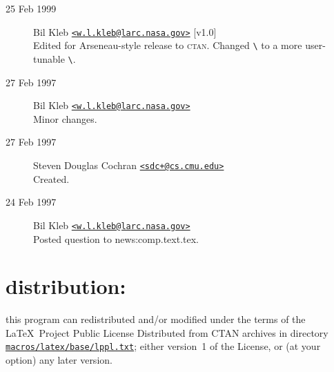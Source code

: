 \documentclass[pagesize=auto, fontsize=12pt, DIV=10, headings=normal]{scrartcl}
\makeatletter
\newcommand*{\bmail}[1]{\href{mailto:#1}{\texttt{<#1>}}}
\newcommand*{\cs}[1]{\texttt{\textbackslash#1}}
\newcommand*{\cmd}[1]{\cs{\expandafter\@gobble\string#1}}
\makeatother
\begin{document}
\begin{description}
\item[25 Feb 1999]
  Bil Kleb \bmail{w.l.kleb@larc.nasa.gov} [v1.0]\\
  Edited for Arseneau-style release to \textsc{ctan}.
  Changed \cmd{\sfm@colsep} to a more user-tunable \cmd{\sfmcolsep}.

\item[27 Feb 1997]
  Bil Kleb \bmail{w.l.kleb@larc.nasa.gov}\\
  Minor changes.

\item[27 Feb 1997]
  Steven Douglas Cochran \bmail{sdc+@cs.cmu.edu}\\
  Created.

\item[24 Feb 1997]
  Bil Kleb \bmail{w.l.kleb@larc.nasa.gov}\\
  Posted question to news:comp.text.tex.
\end{description}


\section{distribution:}

this program can redistributed and/or modified under the terms
of the \LaTeX\ Project Public License Distributed from CTAN
archives in directory \href{http://ctan.org/macros/latex/base/lppl.txt}{\nolinkurl{macros/latex/base/lppl.txt}}; either
version~1 of the License, or (at your option) any later version.
\end{document}
